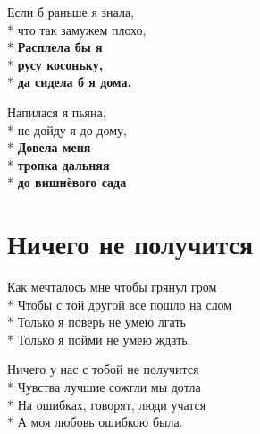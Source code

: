 \medskip

\begin{minipage}{\linewidth}
Если б раньше я знала,\\*
что так замужем плохо,\\*
\textbf{Расплела бы я}\\*
\textbf{русу косоньку,}\\*
\textbf{да сидела б я дома,}\\
\end{minipage}\par\medskip\nobreak

\medskip

\begin{minipage}{\linewidth}
Напилася я пьяна,\\*
не дойду я до дому,\\*
\textbf{Довела меня}\\*
\textbf{тропка дальняя}\\*
\textbf{до вишнёвого сада}\\
\end{minipage}

\vspace{\fill}\newpage

\section{Ничего не получится}
\label{song:Ничего_не_получится}

\medskip

\begin{minipage}{\linewidth}
Как мечталось мне чтобы грянул гром\\*
Чтобы с той другой все пошло на слом\\*
Только я поверь не умею лгать\\*
Только я пойми не умею ждать.\\
\end{minipage}\par\medskip\nobreak

\medskip

\begin{minipage}{\linewidth}
\hspace*{1.5em}Ничего у нас с тобой не получится\\*
\hspace*{1.5em}Чувства лучшие сожгли мы дотла\\*
\hspace*{1.5em}На ошибках, говорят, люди учатся\\*
\hspace*{1.5em}А моя любовь ошибкою была.\\
\end{minipage}\par\medskip\nobreak

